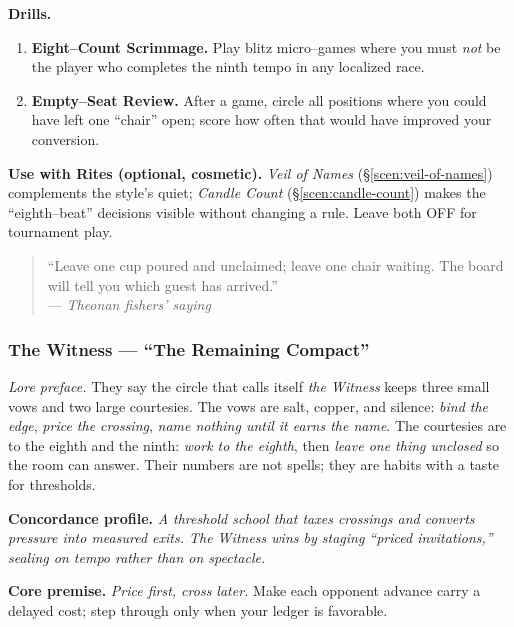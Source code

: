 \documentclass[11pt]{article}
\numberwithin{equation}{section} %
\theoremstyle{plain} %
\theoremstyle{definition} %
\theoremstyle{remark} %
\begin{document}
\medskip
\noindent\textbf{Drills.}
\begin{enumerate}\setlength\itemsep{0.25em}
  \item \textbf{Eight–Count Scrimmage.} Play blitz micro–games where you must \emph{not} be the player who completes the ninth tempo in any localized race.
  \item \textbf{Empty–Seat Review.} After a game, circle all positions where you could have left one “chair” open; score how often that would have improved your conversion.
\end{enumerate}

\medskip
\noindent\textbf{Use with Rites (optional, cosmetic).} \emph{Veil of Names} (\S\ref{scen:veil-of-names}) complements the style’s quiet; \emph{Candle Count} (\S\ref{scen:candle-count}) makes the “eighth–beat” decisions visible without changing a rule. Leave both \textsc{OFF} for tournament play.

\medskip
\begin{quote}\small
“Leave one cup poured and unclaimed; leave one chair waiting. The board will tell you which guest has arrived.”\\
\hfill — \textit{Theonan fishers’ saying}
\end{quote}

\subsubsection{The Witness — “The Remaining Compact”}
\label{school:witness}

\noindent\textit{Lore preface.} They say the circle that calls itself \emph{the Witness} keeps three small vows and two large courtesies. The vows are salt, copper, and silence: \emph{bind the edge}, \emph{price the crossing}, \emph{name nothing until it earns the name}. The courtesies are to the eighth and the ninth: \emph{work to the eighth}, then \emph{leave one thing unclosed} so the room can answer. Their numbers are not spells; they are habits with a taste for thresholds.

\medskip
\noindent\textbf{Concordance profile.} \emph{A threshold school that taxes crossings and converts pressure into measured exits. The Witness wins by staging “priced invitations,” sealing on tempo rather than on spectacle.}

\medskip
\noindent\textbf{Core premise.} \textit{Price first, cross later.} Make each opponent advance carry a delayed cost; step through only when your ledger is favorable.
\end{document}
